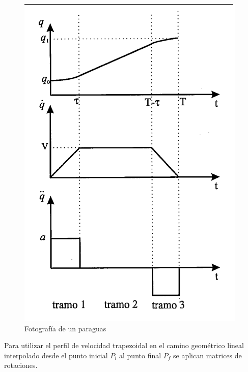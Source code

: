      \begin{figure}[htb]
            \centering
            \includegraphics[width=0.5\linewidth]{Main/Chapter6/Images6/cap6_trayectory_2.png}
            \caption{Fotografía de un paraguas}
            \label{f:cap6_trayectory_2}
        \end{figure} 
    \newpage

    \newpage


    Para utilizar el perfil de velocidad trapezoidal en el camino geométrico lineal interpolado desde el punto inicial $P_i$ al punto final $P_f$ se aplican matrices de rotaciones. 
    
